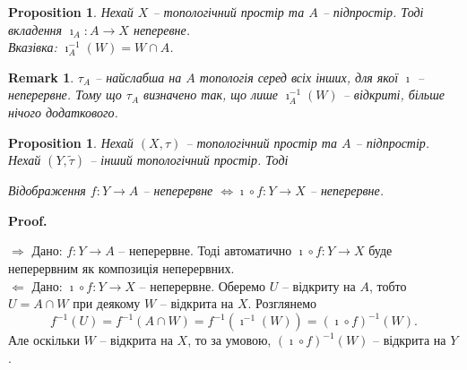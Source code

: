 \documentclass[a4paper, 10pt]{article}
\makeatletter
\def\rightproof{$\boxed{\Rightarrow}$ }
\def\leftproof{$\boxed{\Leftarrow}$ }
\theoremstyle{theoremdd}
\newtheorem{proposition}[theorem]{Proposition}
\newtheorem{remark}[theorem]{Remark}
\renewenvironment{proof}[1][Proof.\\]{\par
\pushQED{\hfill \qed}%
\normalfont \topsep6\p@\@plus6\p@\relax
\trivlist
\item\relax
{\bfseries
#1\@addpunct{.}}\hspace\labelsep\ignorespaces
}{%
\popQED\endtrivlist\@endpefalse
}
\makeatother
\begin{document}
\begin{proposition}
Нехай $X$ -- топологічний простір та $A$ -- підпростір. Тоді вкладення $\imath_A \colon A \to X$ неперевне.\\
\textit{Вказівка: $\imath_A^{-1}(W) = W \cap A$.}
\end{proposition}

\begin{remark}
$\tau_A$ -- найслабша на $A$ топологія серед всіх інших, для якої $\imath$ -- неперервне. Тому що $\tau_A$ визначено так, що лише $\imath_A^{-1}(W)$ -- відкриті, більше нічого додаткового.

\end{remark}

\begin{proposition}
\label{continuity_on_smaller_codomain_iff_continuity_on_bigger_codomain}
Нехай $(X,\tau)$ -- топологічний простір та $A$ -- підпростір. Нехай $(Y,\tilde{\tau})$ -- інший топологічний простір. Тоді
\begin{center}
Відображення $f \colon Y \to A$ -- неперервне $\iff \imath \circ f \colon Y \to X$ -- неперервне.
\end{center}
\begin{figure}[H]
\centering
{}
\end{figure}
\end{proposition}

\begin{proof}
\rightproof Дано: $f \colon Y \to A$ -- неперервне. Тоді автоматично $\imath \circ f \colon Y \to X$ буде неперервним як композиція неперервних.
\bigskip \\
\leftproof Дано: $\imath \circ f \colon Y \to X$ -- неперервне. Оберемо $U$ -- відкриту на $A$, тобто $U = A \cap W$ при деякому $W$ -- відкрита на $X$. Розглянемо 
\[
f^{-1}(U) = f^{-1}(A \cap W) = f^{-1}(\imath^{-1}(W)) = (\imath \circ f)^{-1}(W).
\]
Але оскільки $W$ -- відкрита на $X$, то за умовою, $(\imath \circ f)^{-1}(W)$ -- відкрита на $Y$.
\end{proof}
\end{document}
